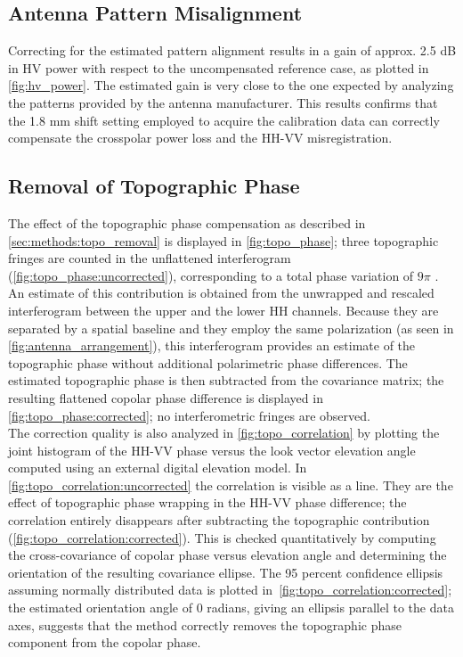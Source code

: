 \subsection{Antenna Pattern Misalignment}\label{sec:discussion:misalignment}
Correcting for the estimated pattern alignment results in a gain of approx. 2.5 dB  in HV power with respect to the uncompensated reference case, as plotted in \autoref{fig:hv_power}. The estimated gain is very close to the one expected by analyzing the patterns provided by the antenna manufacturer. This results confirms that the 1.8 mm shift setting employed to acquire the calibration data can correctly compensate the crosspolar power loss and the HH-VV misregistration.
\subsection{Removal of Topographic Phase}
The effect of the topographic phase compensation as described in \autoref{sec:methods:topo_removal} is displayed in \autoref{fig:topo_phase};
three topographic fringes are counted in the unflattened interferogram (\autoref{fig:topo_phase:uncorrected}), corresponding to a total phase variation of $9 \pi$ . An estimate of this contribution is obtained from the unwrapped and rescaled interferogram between the upper and the lower HH channels. Because they are separated by a spatial baseline and they employ the same polarization (as seen in \autoref{fig:antenna_arrangement}), this interferogram provides an estimate of the topographic phase without additional polarimetric phase differences. The estimated topographic phase is then subtracted from the covariance matrix; the resulting flattened copolar phase difference is displayed in \autoref{fig:topo_phase:corrected}; no interferometric fringes are observed.\\ The correction quality is also analyzed in \autoref{fig:topo_correlation} by plotting the joint histogram of the HH-VV phase versus the look vector elevation angle computed using an external digital elevation model. In \autoref{fig:topo_correlation:uncorrected} the correlation is visible as a line. They are the effect of topographic phase wrapping in the HH-VV phase difference; the correlation entirely disappears after subtracting the topographic contribution (\autoref{fig:topo_correlation:corrected}). This is checked quantitatively by computing the cross-covariance of copolar phase versus elevation angle and determining the orientation of the resulting covariance ellipse. The 95 percent confidence ellipsis assuming normally distributed data is plotted in~\autoref{fig:topo_correlation:corrected}; the estimated orientation angle of 0 radians, giving an ellipsis parallel to the data axes, suggests that the method correctly removes the topographic phase component from the copolar phase.
